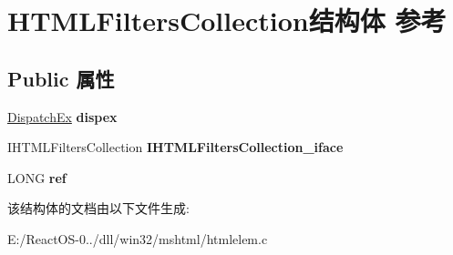 \hypertarget{struct_h_t_m_l_filters_collection}{}\section{H\+T\+M\+L\+Filters\+Collection结构体 参考}
\label{struct_h_t_m_l_filters_collection}
\subsection*{Public 属性}
\begin{DoxyCompactItemize}
\item 
\mbox{\label{struct_h_t_m_l_filters_collection_a810aa8282aac6374121abe7b0fb2b01e}} 
\hyperlink{struct_dispatch_ex}{Dispatch\+Ex} {\bfseries dispex}
\item 
\mbox{\label{struct_h_t_m_l_filters_collection_aeb06e9195c34ca56a5777ecf561f2d9f}} 
I\+H\+T\+M\+L\+Filters\+Collection {\bfseries I\+H\+T\+M\+L\+Filters\+Collection\+\_\+iface}
\item 
\mbox{\label{struct_h_t_m_l_filters_collection_a19ffef221c600ffffbdffa07fc8b8bf2}} 
L\+O\+NG {\bfseries ref}
\end{DoxyCompactItemize}


该结构体的文档由以下文件生成\+:\begin{DoxyCompactItemize}
\item 
E\+:/\+React\+O\+S-\/0../dll/win32/mshtml/htmlelem.\+c\end{DoxyCompactItemize}
